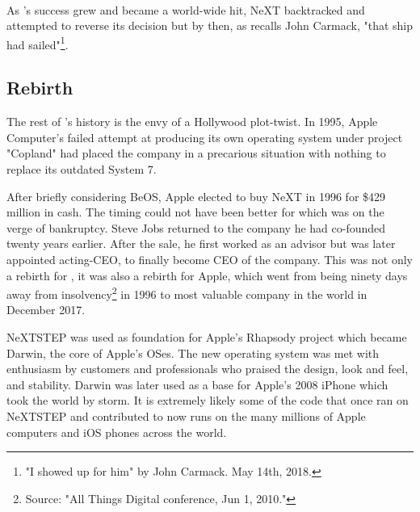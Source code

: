 \\
\par
{}
\par
\vspace{-10pt}
 As \doom{}'s success grew and became a world-wide hit, NeXT backtracked and attempted to reverse its decision but by then, as recalls John Carmack, "that ship had sailed"\footnote{"I showed up for him" by John Carmack.  May 14th, 2018.}.


\subsection{Rebirth}
The rest of \NeXTns{}'s history is the envy of a Hollywood plot-twist. In 1995, Apple Computer's failed attempt at producing its own operating system under project "Copland" had placed the company in a precarious situation with nothing to replace its outdated System 7.\\
\par
 After briefly considering BeOS, Apple elected to buy NeXT in 1996 for \$429 million in cash. The timing could not have been better for \NeXT which was on the verge of bankruptcy. Steve Jobs returned to the company he had co-founded twenty years earlier. After the sale, he first worked as an advisor but was later appointed acting-CEO, to finally become CEO of the company. This was not only a rebirth for \NeXTns, it was also a rebirth for Apple, which went from being ninety days away from insolvency\footnote{Source: "All Things Digital conference, Jun 1, 2010."} in 1996 to most valuable company in the world in December 2017. \\
\par
NeXTSTEP was used as foundation for Apple's Rhapsody project which became Darwin, the core of Apple's OSes. The new operating system was met with enthusiasm by customers and professionals who praised the design, look and feel, and stability. Darwin was later used as a base for Apple's 2008 iPhone which took the world by storm. It is extremely likely some of the code that once ran on NeXTSTEP and contributed to \doom{} now runs on the many millions of Apple computers and iOS phones across the world.\\



